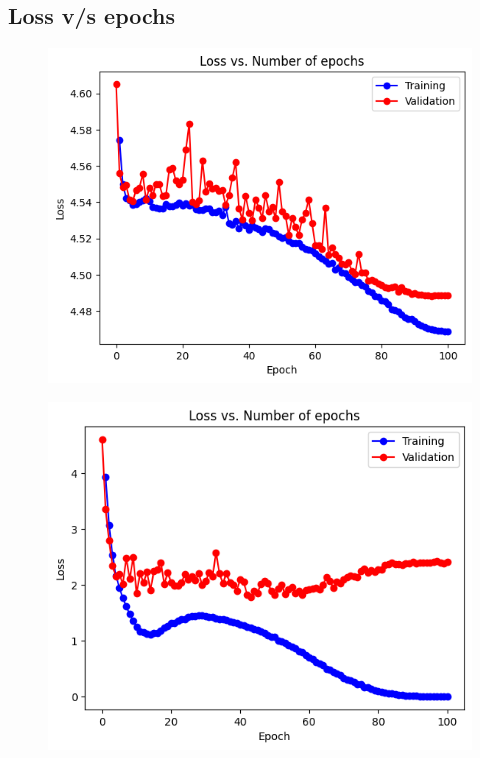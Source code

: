 \documentclass{article}
\begin{document}
\newpage
\subsection{Loss v/s epochs}
\begin{figure}[h]
\centering
\begin{minipage}{.5\textwidth}
  \centering
  \includegraphics[width=.6\linewidth]{assets/softmax_le.png}
  \newline
  \noindent
  \label{fig:test1}
\end{minipage}%
\begin{minipage}{.5\textwidth}
  \centering
  \includegraphics[width=.6\linewidth]{assets/log_softmax_le.png}
  \newline
  \noindent
  \label{fig:test2}
\end{minipage}
\end{figure}
\end{document}
